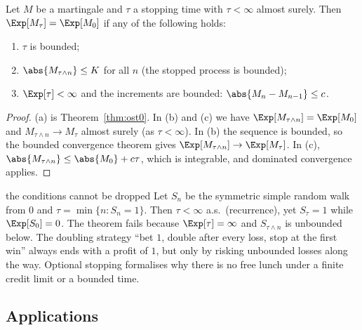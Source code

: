 \begin{theorem}\label{thm:ost}
Let $M$ be a martingale and $\tau$ a stopping time with $\tau<\infty$ almost surely.
Then $\Exp[M_\tau]=\Exp[M_0]$ if any of the following holds:
\begin{enumerate}[label=(\alph*)]
\item $\tau$ is bounded;
\item $\abs{M_{\tau\wedge n}}\le K$ for all $n$ (the stopped process is bounded);
\item $\Exp[\tau]<\infty$ and the increments are bounded: $\abs{M_n-M_{n-1}}\le c$.
\end{enumerate}
\end{theorem}
\begin{proof}
(a) is Theorem~\ref{thm:ost0}. In (b) and (c) we have $\Exp[M_{\tau\wedge n}]=\Exp[M_0]$ and
$M_{\tau\wedge n}\to M_\tau$ almost surely (as $\tau<\infty$). In (b) the sequence is bounded,
so the bounded convergence theorem gives $\Exp[M_{\tau\wedge n}]\to\Exp[M_\tau]$. In (c),
$\abs{M_{\tau\wedge n}}\le\abs{M_0}+c\tau$, which is integrable, and dominated convergence
applies.
\end{proof}

\begin{nuance}{the conditions cannot be dropped}
Let $S_n$ be the symmetric simple random walk from $0$ and $\tau=\min\{n:S_n=1\}$. Then
$\tau<\infty$ a.s.\ (recurrence), yet $S_\tau=1$ while $\Exp[S_0]=0$. The theorem fails
because $\Exp[\tau]=\infty$ and $S_{\tau\wedge n}$ is unbounded below. The doubling
strategy ``bet $1$, double after every loss, stop at the first win'' always ends with a
profit of $1$, but only by risking unbounded losses along the way. Optional stopping
formalises why there is no free lunch under a finite credit limit or a bounded time.
\end{nuance}

\subsection*{Applications}

